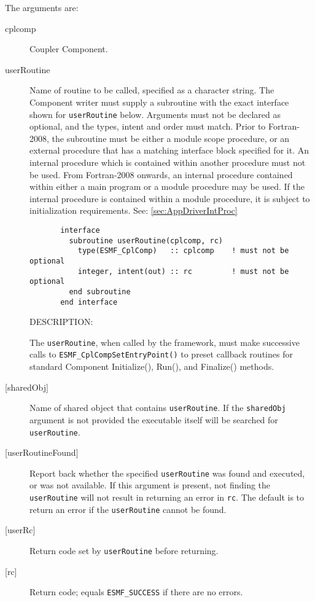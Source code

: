    The arguments are:
   \begin{description}
   \item[cplcomp]
     Coupler Component.
   \item[userRoutine]
     Name of routine to be called, specified as a character string.
     The Component writer must supply a subroutine with the exact interface
     shown for {\tt userRoutine} below. Arguments must not be declared
     as optional, and the types, intent and order must match.
     Prior to Fortran-2008, the subroutine must be either a module scope procedure,
     or an external procedure that has a matching interface block specified for it.
     An internal procedure which is contained within another procedure must not be used.
     From Fortran-2008 onwards, an internal procedure contained within either a main program
     or a module procedure may be used.  If the internal procedure is contained within a
     module procedure, it is subject to initialization requirements.  See: \ref{sec:AppDriverIntProc}
  
\begin{verbatim}       interface
         subroutine userRoutine(cplcomp, rc)
           type(ESMF_CplComp)   :: cplcomp    ! must not be optional
           integer, intent(out) :: rc         ! must not be optional
         end subroutine
       end interface\end{verbatim}
{\sf DESCRIPTION:\\ }


     \begin{sloppypar}
     The {\tt userRoutine}, when called by the framework, must make successive
     calls to {\tt ESMF\_CplCompSetEntryPoint()} to preset callback routines for
     standard Component Initialize(), Run(), and Finalize() methods.
     \end{sloppypar}
   \item[{[sharedObj]}]
     Name of shared object that contains {\tt userRoutine}. If the
     {\tt sharedObj} argument is not provided the executable itself will be
     searched for {\tt userRoutine}.
   \item[{[userRoutineFound]}]
     Report back whether the specified {\tt userRoutine} was found and executed,
     or was not available. If this argument is present, not finding the
     {\tt userRoutine} will not result in returning an error in {\tt rc}.
     The default is to return an error if the {\tt userRoutine} cannot be found.
   \item[{[userRc]}]
     Return code set by {\tt userRoutine} before returning.
   \item[{[rc]}]
     Return code; equals {\tt ESMF\_SUCCESS} if there are no errors.
   \end{description}
   
